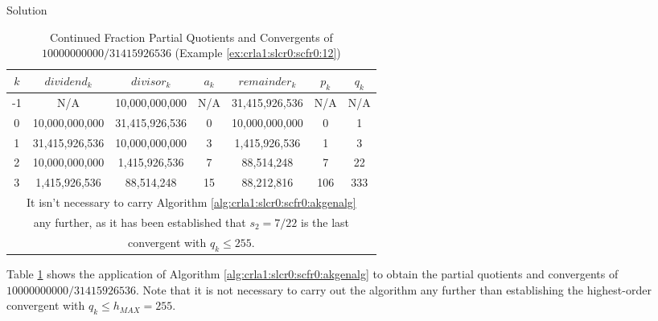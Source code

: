 \begin{vworkexampleparsection}{Solution}
\begin{table}
\caption{Continued Fraction Partial Quotients and Convergents of $10000000000/31415926536$ (Example \ref{ex:crla1:slcr0:scfr0:12})}
\label{tbl:ex:crla1:slcr0:scfr0:12a}
\begin{center}
\begin{tabular}{|c|c|c|c|c|c|c|}
\hline
\small{$k$} & \small{$dividend_k$}  & \small{$divisor_k$}   & \small{$a_k$} & \small{$remainder_k$}    & \small{$p_k$}            & \small{$q_k$}            \\
\hline
\hline
\small{-1}   & \small{N/A}            & \small{10,000,000,000} & \small{N/A}    & \small{31,415,926,536}    & \small{N/A}               & \small{N/A}               \\
\hline
\small{0}    & \small{10,000,000,000} & \small{31,415,926,536} & \small{0}      & \small{10,000,000,000}    & \small{0}                 & \small{1}                 \\
\hline
\small{1}    & \small{31,415,926,536} & \small{10,000,000,000} & \small{3}      & \small{1,415,926,536}     & \small{1}                 & \small{3}                 \\
\hline
\small{2}    & \small{10,000,000,000} & \small{1,415,926,536}  & \small{7}      & \small{88,514,248}        & \small{7}                 & \small{22}                \\
\hline
\small{3}    & \small{1,415,926,536}  & \small{88,514,248}     & \small{15}     & \small{88,212,816}        & \small{106}               & \small{333}               \\
\hline
\multicolumn{7}{|c|}{\small{It isn't necessary to carry Algorithm \ref{alg:crla1:slcr0:scfr0:akgenalg}}}  \\ 
\multicolumn{7}{|c|}{\small{any further, as it has been established that $s_2 = 7/22$ is the last}}       \\
\multicolumn{7}{|c|}{\small{convergent with $q_k \leq 255$.}}                                             \\
\hline
\end{tabular}
\end{center}
\end{table}

Table \ref{tbl:ex:crla1:slcr0:scfr0:12a} shows the application of 
Algorithm \ref{alg:crla1:slcr0:scfr0:akgenalg} to obtain the partial
quotients and convergents of $10000000000/31415926536$.  Note that it is not
necessary to carry out the algorithm any further than establishing the
highest-order convergent with $q_k \leq h_{MAX} = 255$.


\end{vworkexampleparsection}
